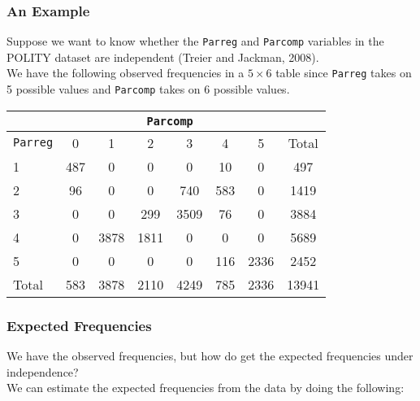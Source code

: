 \documentclass[handout]{beamer}
\begin{document}
\begin{frame}
\frametitle{An Example}
Suppose we want to know whether the {\tt Parreg} and
{\tt Parcomp} variables in the POLITY dataset are independent (Treier
and Jackman, 2008).\\
\pause
\bigskip
We have the following observed frequencies in a $5 \times 6$ table
since {\tt Parreg} takes on 5 possible values and {\tt Parcomp} takes
on 6 possible values.
\pause
\footnotesize
\begin{table}
\begin{center}
\begin{tabular}{l|cccccc|c}
& \multicolumn{6}{c}{{\tt Parcomp}} & \\
\hline
{\tt Parreg} & 0 & 1 & 2 & 3 & 4 & 5 & Total\\
\hline
1 & 487 & 0 & 0 & 0 & 10 & 0 & 497 \\
2 & 96 & 0 & 0 & 740 & 583 & 0 & 1419\\
3 & 0 & 0 & 299 & 3509 & 76 & 0 & 3884\\
4 & 0 & 3878 & 1811 & 0 & 0 & 0 & 5689\\
5 & 0 & 0 & 0 & 0 & 116 & 2336 & 2452\\
\hline
Total & 583 & 3878 & 2110 & 4249 & 785 & 2336 & 13941\\
\end{tabular}
\end{center}
\end{table}
\normalsize
\end{frame}

\begin{frame}
\frametitle{Expected Frequencies}
\pause
We have the observed frequencies, but how do get the expected
frequencies under independence? \\
\bigskip
\pause
We can estimate the expected frequencies from the data by doing the following:\\
\end{frame}
\end{document}
